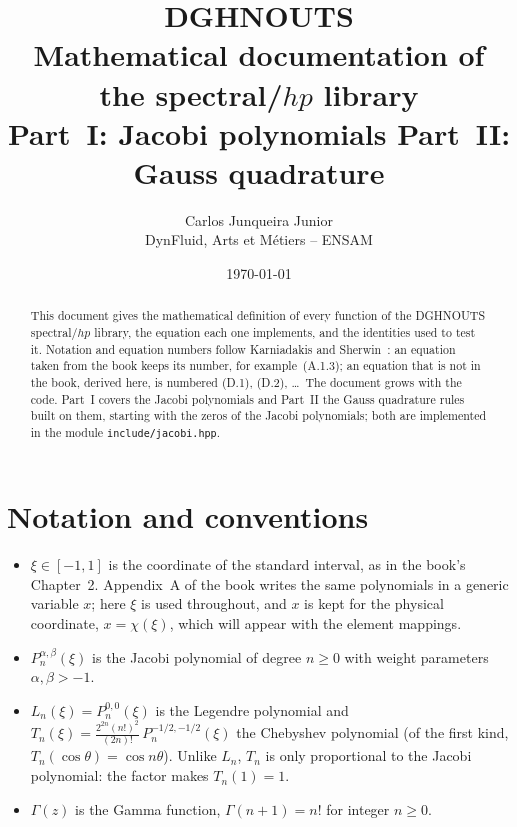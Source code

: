 \documentclass[11pt,a4paper]{article}
\title{\textbf{DGHNOUTS}\\[0.3em]
  \large Mathematical documentation of the spectral/$hp$ library\\[0.2em]
  \normalsize Part~I: Jacobi polynomials \quad Part~II: Gauss quadrature}
\author{Carlos Junqueira Junior\\ \small DynFluid, Arts et M\'etiers -- ENSAM}
\date{\today}
\newcommand{\Jac}[3]{P_{#1}^{#2,#3}}            %
\newcommand{\Pab}[1]{P_{#1}^{\alpha,\beta}}     %
\newcommand{\code}[1]{\texttt{#1}}
\begin{document}
\maketitle

\begin{abstract}
This document gives the mathematical definition of every function of the
DGHNOUTS spectral/$hp$ library, the equation each one implements, and the
identities used to test it. Notation and equation numbers follow Karniadakis
and Sherwin~\cite{KS2005}: an equation taken from the book keeps its number,
for example~(A.1.3); an equation that is not in the book, derived here, is
numbered (D.1), (D.2), \dots\ The document grows with the code. Part~I
covers the Jacobi polynomials and Part~II the Gauss quadrature rules built on
them, starting with the zeros of the Jacobi polynomials; both are implemented
in the module \code{include/jacobi.hpp}.
\end{abstract}

\tableofcontents

\section{Notation and conventions}

\begin{itemize}
  \item $\xi \in [-1,1]$ is the coordinate of the standard interval, as in the
        book's Chapter~2. Appendix~A of the book writes the same polynomials
        in a generic variable $x$; here $\xi$ is used throughout, and $x$ is
        kept for the physical coordinate, $x=\chi(\xi)$, which will appear
        with the element mappings.
  \item $\Pab{n}(\xi)$ is the Jacobi polynomial of degree $n \ge 0$ with
        weight parameters $\alpha,\beta > -1$.
  \item $L_n(\xi) = \Jac{n}{0}{0}(\xi)$ is the Legendre polynomial and
        $T_n(\xi) = \frac{2^{2n}(n!)^2}{(2n)!}\,\Jac{n}{-1/2}{-1/2}(\xi)$ the
        Chebyshev polynomial (of the first kind, $T_n(\cos\theta)=\cos n\theta$).
        Unlike $L_n$, $T_n$ is only proportional to the Jacobi polynomial:
        the factor makes $T_n(1)=1$.
  \item $\Gamma(z)$ is the Gamma function, $\Gamma(n+1)=n!$ for integer $n\ge0$.
\end{itemize}
\end{document}
